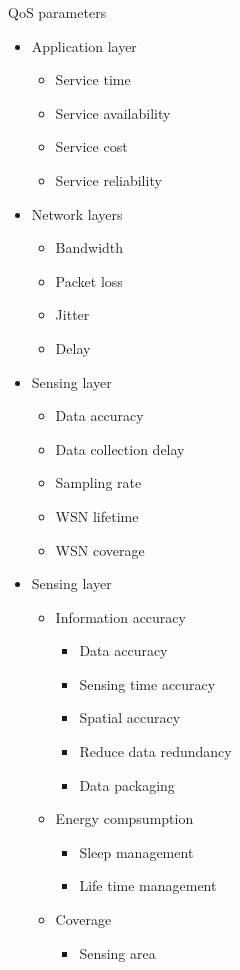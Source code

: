 QoS parameters \cite{meshinchi_qosaware_2018} \cite{chowdhury_survey_2018}
	\begin{itemize}
		\item Application layer
			\begin{itemize}
				\item Service time
				\item Service availability
				\item Service cost
				\item Service reliability
			\end{itemize}
			
		\item Network layers
				\begin{itemize}
					\item Bandwidth
					\item Packet loss
					\item Jitter
					\item Delay
				\end{itemize}
				
		\item Sensing layer
			\begin{itemize}
				\item Data accuracy
				\item Data collection delay
				\item Sampling rate
				\item WSN lifetime
				\item WSN coverage
			\end{itemize}

		\item Sensing layer
			\begin{itemize}
				\item Information accuracy
					\begin{itemize}
						\item Data accuracy
						\item Sensing time accuracy
						\item Spatial accuracy
						\item Reduce data redundancy
						\item Data packaging
					\end{itemize}
					
				\item Energy compsumption
					\begin{itemize}
						\item Sleep management
						\item Life time management
					\end{itemize}
					
				\item Coverage
					\begin{itemize}
						\item Sensing area
					\end{itemize}
			\end{itemize}
	\end{itemize}

